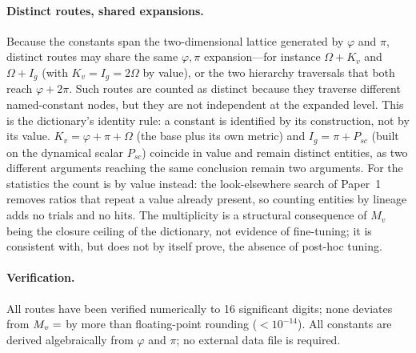 \documentclass[12pt,a4paper]{article}
\begin{document}
\paragraph{Distinct routes, shared expansions.}
Because the constants span the two-dimensional lattice generated by $\varphi$
and $\pi$, distinct routes may share the same $\varphi,\pi$ expansion---for
instance $\Omega+K_v$ and $\Omega+I_g$ (with $K_v=I_g=2\Omega$ by value), or the two hierarchy traversals that
both reach $\varphi+2\pi$. Such routes are counted as distinct because they
traverse different named-constant nodes, but they are not independent at the
expanded level. This is the dictionary's identity rule: a constant is identified by
its construction, not by its value. $K_v=\varphi+\pi+\Omega$ (the base plus its own
metric) and $I_g=\pi+P_{sc}$ (built on the dynamical scalar $P_{sc}$) coincide in value
and remain distinct entities, as two different arguments reaching the same conclusion
remain two arguments. For the statistics the count is by value instead: the
look-elsewhere search of Paper~1 removes ratios that repeat a value already present, so
counting entities by lineage adds no trials and no hits. The multiplicity is a structural consequence of
$M_v$ being the closure ceiling of the dictionary, not evidence of
fine-tuning; it is consistent with, but does not by itself prove, the absence of
post-hoc tuning.

\paragraph{Verification.}
All  routes have been verified numerically to 16 significant digits; none
deviates from $M_v = \val{M_V_d15}$ by more than floating-point
rounding ($<10^{-14}$). All constants are derived algebraically from $\varphi$
and $\pi$; no external data file is required.
\end{document}
